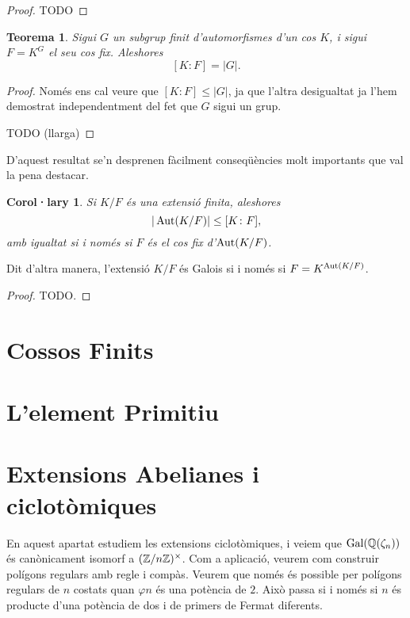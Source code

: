 \documentclass[
]{book}
\newtheorem{theorem}{Teorema}[chapter]
\newtheorem{corollary}{Corol·lary}[chapter]
\theoremstyle{definition}
\theoremstyle{definition}
\theoremstyle{definition}
\theoremstyle{definition}
\theoremstyle{remark}
\begin{document}
\begin{proof}
TODO
\end{proof}

\begin{theorem}
Sigui \(G\) un subgrup finit d'automorfismes d'un cos \(K\), i sigui \(F=K^G\) el seu cos fix. Aleshores
\[
[K\colon F] = |G|.
\]
\end{theorem}

\begin{proof}
Només ens cal veure que \([K\colon F] \leq |G|\), ja que l'altra desigualtat ja l'hem demostrat independentment
del fet que \(G\) sigui un grup.

TODO (llarga)
\end{proof}

D'aquest resultat se'n desprenen fàcilment conseqüències molt importants que val la pena destacar.

\begin{corollary}
Si \(K/F\) és una extensió finita, aleshores
\[
|\operatorname{Aut}(K/F)| \leq [K\colon F],
\]
amb igualtat si i només si \(F\) és el cos fix d'\(\operatorname{Aut}(K/F)\).
\end{corollary}

Dit d'altra manera, l'extensió \(K/F\) és Galois si i només si \(F=K^{\operatorname{Aut}(K/F)}\).

\begin{proof}
TODO.
\end{proof}

\hypertarget{cossos-finits}{%
\chapter{Cossos Finits}\label{cossos-finits}}

\hypertarget{lelement-primitiu}{%
\chapter{L'element Primitiu}\label{lelement-primitiu}}

\hypertarget{extensions-abelianes-i-ciclotuxf2miques}{%
\chapter{Extensions Abelianes i ciclotòmiques}\label{extensions-abelianes-i-ciclotuxf2miques}}

En aquest apartat estudiem les extensions ciclotòmiques, i veiem que \(\operatorname{Gal}(\mathbb{Q}(\zeta_n))\)
és canònicament isomorf a \((\mathbb{Z}/n\mathbb{Z})^\times\). Com a aplicació, veurem com construir
polígons regulars amb regle i compàs. Veurem que només és possible per polígons regulars
de \(n\) costats quan \(\varphi{n}\) és una potència de \(2\). Això passa si i només si \(n\) és producte
d'una potència de dos i de primers de Fermat diferents.
\end{document}
